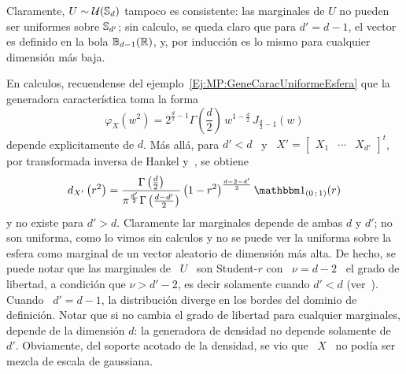 \begin{ejemplo}\label{Ej:MP:UniformeCnt}
%
  Claramente, $U \sim  \mathcal{U}(\mathbb{S}_d)$ tampoco es consistente: las  marginales de $U$ no
  pueden ser uniformes sobre $\mathbb{S}_{d'}$;  sin calculo, se queda claro que para
  $d' =  d-1$, el  vector es  definido en la  bola $\mathbb{B}_{d-1}(\mathbb{R})$,  y, por
  inducci\'on es lo mismo para cualquier dimensi\'on m\'as baja.

  En  calculos, recuendense del  ejemplo~\ref{Ej:MP:GeneCaracUniformeEsfera} que
  la generadora caracter\'istica toma la forma
  \[
  \varphi_X\left(  w^2  \right)  =  2^{\frac{d}{2}-1}  \Gamma\left(  \frac{d}{2}
  \right) \, w^{1-\frac{d}{2}} \, J_{\frac{d}{2}-1}\left( w \right)
  \]
  depende  explicitamente  de $d$.  M\'as  all\'a,  para $d'  <  d$  \  y \  $X'
  =  \begin{bmatrix} X_1 &  \cdots &  X_{d'} \end{bmatrix}^t$,  por transformada
  inversa de Hankel y~\cite[Ec.~6.575-1]{GraRyz15}, se obtiene
  \[
  d_{X'}\left(     r^2      \right)     =     \frac{\Gamma\left(     \frac{d}{2}
    \right)}{\pi^{\frac{d'}{2}} \Gamma\left( \frac{d-d'}{2}  \right)} \left( 1 -
    r^2 \right)^{\frac{d-2-d'}{2}} \un_{(0 \; 1)}(r)
  \]
  y no existe para  $d' > d$.  Claramente lar marginales depende  de ambas $d$ y
  $d'$;  no son  uniforma, como  lo vimos  sin  calculos y  no se  puede ver  la
  uniforma sobre la  esfera como marginal de un  vector aleatorio de dimensi\'on
  m\'as  alta.  De  hecho, se  puede notar  que las  marginales de  \ $U$  \ son
  Student-$r$ con \ $\nu = d-2$ \ el grado de libertad, a condici\'on que $\nu >
  d'-2$, es decir solamente cuando $d' < d$ (ver~\cite{titi, toto, Zoz}). Cuando
  \  $d'  =  d-1$, la  distribuci\'on  diverge  en  los  bordes del  dominio  de
  definici\'on.   Notar que si  no cambia  el grado  de libertad  para cualquier
  marginales,  depende de  la  dimensi\'on  $d$: la  generadora  de densidad  no
  depende solamente de $d'$.  Obviamente, del soporte acotado de la densidad, se
  vio que \ $X$ \ no pod\'ia ser mezcla de escala de gaussiana.
\end{ejemplo}

